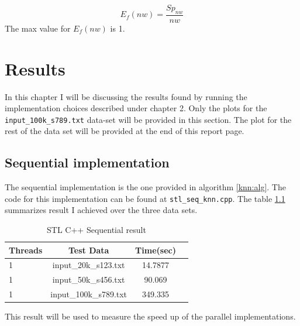 \documentclass[12pt,a4paper]{report}
\begin{document}
\begin{equation}
E_f(nw) = \frac{Sp_{nw}}{nw} 
\end{equation}
The max value for $E_f(nw)$ is 1.

\chapter{Results}
In this chapter I will be discussing the results found by running the implementation choices described under chapter 2. Only the plots for the  \verb!input_100k_s789.txt! data-set will be provided in this section. The plot for the rest of the data set will be provided at the end of this report page.
\section{Sequential implementation}
The sequential implementation is the one provided in algorithm \ref{knn:alg}. The  code for this implementation can be found at \verb!stl_seq_knn.cpp!. The table \ref{seqresulttable} summarizes result I achieved over the three data sets.

\begin{table}[htp]
  \begin{center}
    \begin{tabular}{l c c c} %
      Threads & Test Data & Time(sec)  \\
      \midrule
      1 & input\_20k\_s123.txt  & 14.7877 \\
      1 & input\_50k\_s456.txt  & 90.069 \\
      1 & input\_100k\_s789.txt & 349.335 \\
      \bottomrule
    \end{tabular}
    \caption{STL C++ Sequential result}
    \label{seqresulttable}
  \end{center}
\end{table}
This result will be used to measure the speed up of the parallel implementations.
\end{document}
